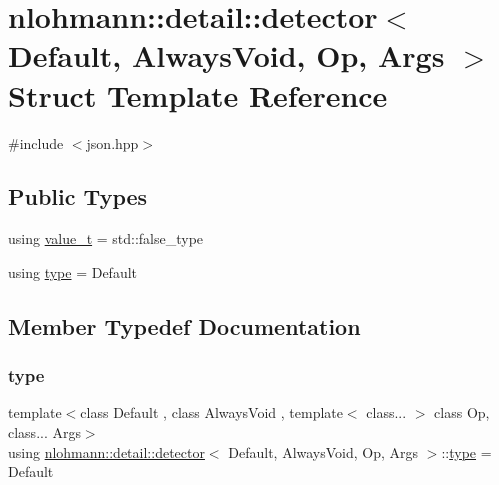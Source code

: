 \hypertarget{structnlohmann_1_1detail_1_1detector}{}\section{nlohmann\+::detail\+::detector$<$ Default, Always\+Void, Op, Args $>$ Struct Template Reference}
\label{structnlohmann_1_1detail_1_1detector}


{\ttfamily \#include $<$json.\+hpp$>$}

\subsection*{Public Types}
\begin{DoxyCompactItemize}
\item 
using \mbox{\hyperlink{structnlohmann_1_1detail_1_1detector_a5a132aab543d1706e2439268faf8d487}{value\+\_\+t}} = std\+::false\+\_\+type
\item 
using \mbox{\hyperlink{structnlohmann_1_1detail_1_1detector_a0cd69423587748bf3d3d702cc7b7c2ce}{type}} = Default
\end{DoxyCompactItemize}


\subsection{Member Typedef Documentation}
\mbox{\label{structnlohmann_1_1detail_1_1detector_a0cd69423587748bf3d3d702cc7b7c2ce}} 
\subsubsection{\texorpdfstring{type}{type}}
{\footnotesize\ttfamily template$<$class Default , class Always\+Void , template$<$ class... $>$ class Op, class... Args$>$ \\
using \mbox{\hyperlink{structnlohmann_1_1detail_1_1detector}{nlohmann\+::detail\+::detector}}$<$ Default, Always\+Void, Op, Args $>$\+::\mbox{\hyperlink{structnlohmann_1_1detail_1_1detector_a0cd69423587748bf3d3d702cc7b7c2ce}{type}} =  Default}

